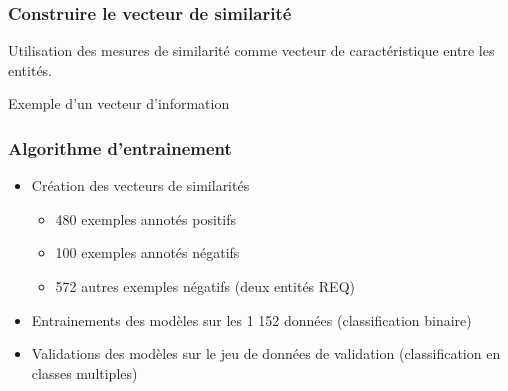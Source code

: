 \documentclass{beamer}
\begin{document}
	\begin{frame}[label=vec]\frametitle{Construire le vecteur de similarité}
		Utilisation des mesures de similarité comme vecteur de caractéristique entre les entités.
		\begin{block}{Exemple d'un vecteur d'information}
		\end{block}
	\end{frame}
	
	\begin{frame}[label=sim]\frametitle{Algorithme d'entrainement}
		\begin{itemize}
			\item<1-> Création des vecteurs de similarités 
			\begin{itemize}
				\item 480 exemples annotés positifs
				\item 100 exemples annotés négatifs
				\item 572 autres exemples négatifs (deux entités REQ)
			\end{itemize}
			\item<2-> Entrainements des modèles sur les 1 152 données (classification binaire)
			\item<3-> Validations des modèles sur le jeu de données de validation (classification en classes multiples)
		\end{itemize}
	\end{frame}
	
\end{document}
